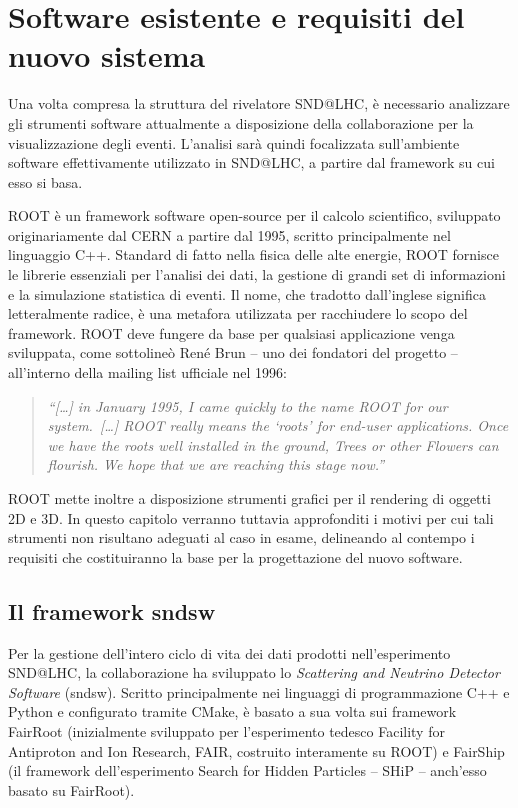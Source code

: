 \chapter{Software esistente e requisiti del nuovo sistema}
\label{cap:software_esistente_requisiti}

Una volta compresa la struttura del rivelatore SND@LHC, è necessario analizzare gli strumenti software attualmente a disposizione della collaborazione per la visualizzazione degli eventi.
L’analisi sarà quindi focalizzata sull’ambiente software effettivamente utilizzato in SND@LHC, a partire dal framework su cui esso si basa.

ROOT è un framework software open-source per il calcolo scientifico, sviluppato
originariamente dal CERN a partire dal 1995, scritto principalmente nel linguaggio C++.
Standard di fatto nella fisica delle alte energie, ROOT fornisce le librerie essenziali per l'analisi dei dati, la gestione di grandi set di informazioni e la simulazione statistica di eventi.
Il nome, che tradotto dall'inglese significa letteralmente radice, è una metafora utilizzata per racchiudere lo scopo del framework.
ROOT deve fungere da base per qualsiasi applicazione venga sviluppata, come sottolineò René Brun -- uno dei fondatori del progetto -- all'interno della mailing list ufficiale nel 1996:
\begin{quote}
    \textit{“[\ldots] in January 1995, I came quickly to the name ROOT for our system.\ [\ldots] ROOT really means the `roots' for end-user applications. Once we have the roots well installed in the ground, Trees or other Flowers can flourish. We hope that we are reaching this stage now.”}\cite{root_name_origin}
\end{quote}

ROOT mette inoltre a disposizione strumenti grafici per il rendering di oggetti 2D e 3D. In questo capitolo verranno tuttavia approfonditi i motivi per cui tali strumenti non risultano adeguati al caso in esame, delineando al contempo i requisiti che costituiranno la base per la progettazione del nuovo software.

%
%
\section{Il framework sndsw}
Per la gestione dell'intero ciclo di vita dei dati prodotti nell'esperimento SND@LHC, la collaborazione ha sviluppato lo \emph{Scattering and Neutrino Detector Software} (sndsw).
Scritto principalmente nei linguaggi di programmazione C++ e Python e configurato tramite CMake, è basato a sua volta sui framework FairRoot (inizialmente sviluppato per l’esperimento tedesco Facility for Antiproton and Ion Research, FAIR, costruito interamente su ROOT) e FairShip (il framework dell’esperimento Search for Hidden Particles -- SHiP -- anch'esso basato su FairRoot).

